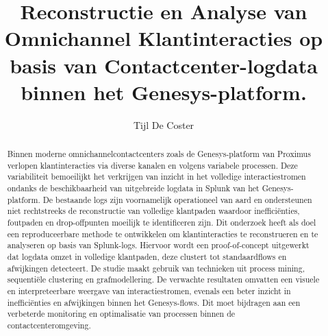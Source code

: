 \documentclass{hogent-article}
\title{Reconstructie en Analyse van Omnichannel Klantinteracties op basis van Contactcenter-logdata binnen het Genesys-platform.}
\author{Tijl De Coster}
\begin{document}
\begin{abstract}
  Binnen moderne omnichannelcontactcenters zoals de Genesys-platform van Proximus verlopen klantinteracties via diverse kanalen en volgens variabele processen. Deze variabiliteit bemoeilijkt het verkrijgen van inzicht in het volledige interactiestromen ondanks de beschikbaarheid van uitgebreide logdata in Splunk van het Genesys-platform. De bestaande logs zijn voornamelijk operationeel van aard en ondersteunen niet rechtstreeks de reconstructie van volledige klantpaden waardoor ineffici\"enties, foutpaden en drop-offpunten moeilijk te identificeren zijn.
  Dit onderzoek heeft als doel een reproduceerbare methode te ontwikkelen om klantinteracties te reconstrueren en te analyseren op basis van Splunk-logs. Hiervoor wordt een proof-of-concept uitgewerkt dat logdata omzet in volledige klantpaden, deze clustert tot standaardflows en afwijkingen detecteert. De studie maakt gebruik van technieken uit process mining, sequenti\"ele clustering en grafmodellering.
  De verwachte resultaten omvatten een visuele en interpreteerbare weergave van interactiestromen, evenals een beter inzicht in ineffici\"enties en afwijkingen binnen het Genesys-flows. Dit moet bijdragen aan een verbeterde monitoring en optimalisatie van processen binnen de contactcenteromgeving.
\end{abstract}

\tableofcontents



\printbibliography[heading=bibintoc]
\end{document}
